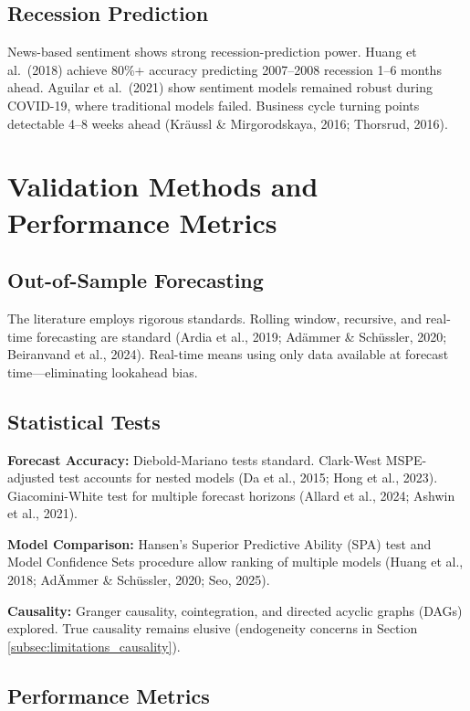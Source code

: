 \documentclass[12pt,a4paper]{article}
\begin{document}
\subsection{Recession Prediction}
\label{subsec:recession}

News-based sentiment shows strong recession-prediction power. Huang et al.\ (2018) achieve 80\%+ accuracy predicting 2007--2008 recession 1--6 months ahead. Aguilar et al.\ (2021) show sentiment models remained robust during COVID-19, where traditional models failed. Business cycle turning points detectable 4--8 weeks ahead (Kräussl \& Mirgorodskaya, 2016; Thorsrud, 2016).

\section{Validation Methods and Performance Metrics}
\label{sec:validation}

\subsection{Out-of-Sample Forecasting}

The literature employs rigorous standards. Rolling window, recursive, and real-time forecasting are standard (Ardia et al., 2019; Adämmer \& Schüssler, 2020; Beiranvand et al., 2024). Real-time means using only data available at forecast time—eliminating lookahead bias.

\subsection{Statistical Tests}

\textbf{Forecast Accuracy:} Diebold-Mariano tests standard. Clark-West MSPE-adjusted test accounts for nested models (Da et al., 2015; Hong et al., 2023). Giacomini-White test for multiple forecast horizons (Allard et al., 2024; Ashwin et al., 2021).

\textbf{Model Comparison:} Hansen's Superior Predictive Ability (SPA) test and Model Confidence Sets procedure allow ranking of multiple models (Huang et al., 2018; AdÄmmer \& Schüssler, 2020; Seo, 2025).

\textbf{Causality:} Granger causality, cointegration, and directed acyclic graphs (DAGs) explored. True causality remains elusive (endogeneity concerns in Section \ref{subsec:limitations_causality}).

\subsection{Performance Metrics}
\end{document}
